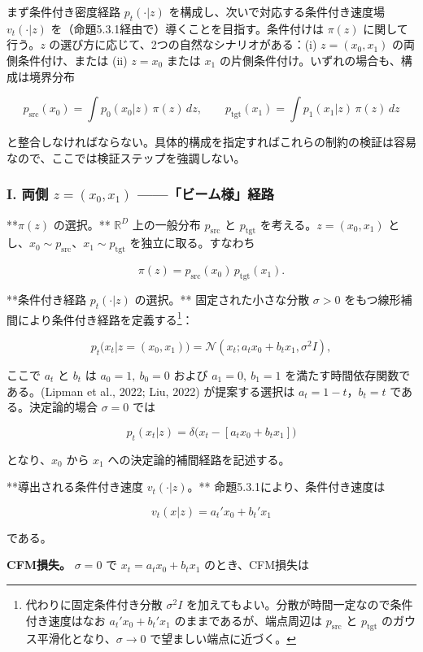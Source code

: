 まず条件付き密度経路 $p_t(\cdot|z)$ を構成し、次いで対応する条件付き速度場 $v_t(\cdot|z)$ を（命題5.3.1経由で）導くことを目指す。条件付けは $\pi(z)$ に関して行う。$z$ の選び方に応じて、2つの自然なシナリオがある：(i) $z=(x_0,x_1)$ の両側条件付け、または (ii) $z=x_0$ または $x_1$ の片側条件付け。いずれの場合も、構成は境界分布

\[
p_{\mathrm{src}}(x_0)=\int p_0(x_0|z)\,\pi(z)\,dz,\qquad
p_{\mathrm{tgt}}(x_1)=\int p_1(x_1|z)\,\pi(z)\,dz
\]


と整合しなければならない。具体的構成を指定すればこれらの制約の検証は容易なので、ここでは検証ステップを強調しない。

\subsubsection*{I. 両側 $z=(x_0,x_1)$ ——「ビーム様」経路}


**$\pi(z)$ の選択。** $\mathbb{R}^D$ 上の一般分布 $p_{\mathrm{src}}$ と $p_{\mathrm{tgt}}$ を考える。$z=(x_0,x_1)$ とし、$x_0\sim p_{\mathrm{src}}$、$x_1\sim p_{\mathrm{tgt}}$ を独立に取る。すなわち

\[
\pi(z)=p_{\mathrm{src}}(x_0)\,p_{\mathrm{tgt}}(x_1).
\]


**条件付き経路 $p_t(\cdot|z)$ の選択。** 固定された小さな分散 $\sigma>0$ をもつ線形補間により条件付き経路を定義する\footnote{代わりに固定条件付き分散 $\sigma^2 I$ を加えてもよい。分散が時間一定なので条件付き速度はなお $a_t'x_0+b_t'x_1$ のままであるが、端点周辺は $p_{\mathrm{src}}$ と $p_{\mathrm{tgt}}$ のガウス平滑化となり、$\sigma\to 0$ で望ましい端点に近づく。}：

\[
p_t\bigl(x_t|z=(x_0,x_1)\bigr)=\mathcal{N}(x_t;a_t x_0+b_t x_1,\sigma^2 I),
\]


ここで $a_t$ と $b_t$ は $a_0=1,\ b_0=0$ および $a_1=0,\ b_1=1$ を満たす時間依存関数である。(Lipman et al., 2022; Liu, 2022) が提案する選択は $a_t=1-t$，$b_t=t$ である。決定論的場合 $\sigma=0$ では

\[
p_t(x_t|z)=\delta\bigl(x_t-[a_t x_0+b_t x_1]\bigr)
\]


となり、$x_0$ から $x_1$ への決定論的補間経路を記述する。


**導出される条件付き速度 $v_t(\cdot|z)$。** 命題5.3.1により、条件付き速度は

\[
v_t(x|z)=a_t' x_0+b_t' x_1
\]


である。

\textbf{CFM損失。} $\sigma=0$ で $x_t=a_t x_0+b_t x_1$ のとき、CFM損失は

